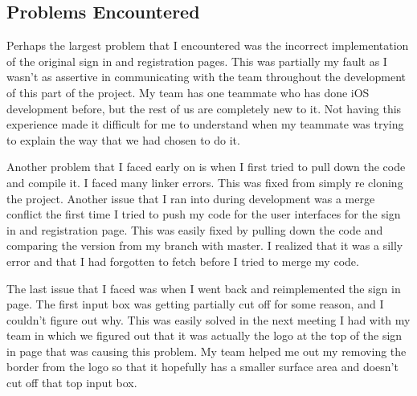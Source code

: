 \documentclass[onecolumn, draftclsnofoot,10pt, compsoc]{IEEEtran}
\begin{document}
\subsection{Problems Encountered}
\par Perhaps the largest problem that I encountered was the incorrect implementation of the original sign in and registration pages. This was partially my fault as I wasn’t as assertive in communicating with the team throughout the development of this part of the project.  My team has one teammate who has done iOS development before, but the rest of us are completely new to it. Not having this experience made it difficult for me to understand when my teammate was trying to explain the way that we had chosen to do it.
\par Another problem that I faced early on is when I first tried to pull down the code and compile it. I faced many linker errors. This was fixed from simply re cloning the project. Another issue that I ran into during development was a merge conflict the first time I tried to push my code for the user interfaces for the sign in and registration page. This was easily fixed by pulling down the code and comparing the version from my branch with master. I realized that it was a silly error and that I had forgotten to fetch before I tried to merge my code. 
\par The last issue that I faced was when I went back and reimplemented the sign in page. The first input box was getting partially cut off for some reason, and I couldn’t figure out why. This was easily solved in the next meeting I had with my team in which we figured out that it was actually the logo at the top of the sign in page that was causing this problem. My team helped me out my removing the border from the logo so that it hopefully has a smaller surface area and doesn’t cut off that top input box.
\end{document}

